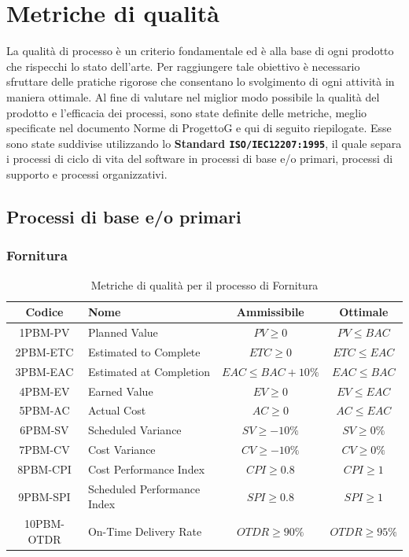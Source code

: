 \documentclass{article}
\begin{document}
\section{Metriche di qualità}
La qualità di processo è un criterio fondamentale ed è alla base di ogni prodotto che
rispecchi lo stato dell’arte. Per raggiungere tale obiettivo è necessario sfruttare delle
pratiche rigorose che consentano lo svolgimento di ogni attività in maniera ottimale.
Al fine di valutare nel miglior modo possibile la qualità del prodotto e l’efficacia dei
processi, sono state definite delle metriche, meglio specificate nel documento Norme
di ProgettoG e qui di seguito riepilogate. Esse sono state suddivise utilizzando lo \textbf{Standard \texttt{ISO/IEC12207:1995}}, il quale separa i processi di ciclo di vita del software in processi di
base e/o primari, processi di supporto e processi organizzativi.
\subsection{Processi di base e/o primari}
\subsubsection{Fornitura} %
\begin{table}[H]
    \centering
    \renewcommand{\arraystretch}{1.5} %
    \begin{tabular}{|c|l|c|c|}
        \hline
        \textbf{Codice} & \textbf{Nome} & \textbf{Ammissibile} & \textbf{Ottimale} \\
        \hline
        1PBM-PV & Planned Value & $PV \geq 0$ & $PV \leq BAC$ \\
        2PBM-ETC & Estimated to Complete & $ETC \geq 0$ & $ETC \leq EAC$ \\
        3PBM-EAC & Estimated at Completion & $EAC \leq BAC + 10\%$ & $EAC \leq BAC$ \\
        4PBM-EV & Earned Value & $EV \geq 0$ & $EV \leq EAC$ \\
        5PBM-AC & Actual Cost & $AC \geq 0$ & $AC \leq EAC$ \\
        6PBM-SV & Scheduled Variance & $SV \geq -10\%$ & $SV \geq 0\%$ \\
        7PBM-CV & Cost Variance & $CV \geq -10\%$ & $CV \geq 0\%$ \\
        8PBM-CPI & Cost Performance Index & $CPI \geq 0.8$ & $CPI \geq 1$ \\
        9PBM-SPI & Scheduled Performance Index & $SPI \geq 0.8$ & $SPI \geq 1$ \\
        10PBM-OTDR & On-Time Delivery Rate & $OTDR \geq 90\%$ & $OTDR \geq 95\%$ \\
        \hline
    \end{tabular}
    \label{tab:fornitura}
    \caption{Metriche di qualità per il processo di Fornitura}
\end{table}
\end{document}
